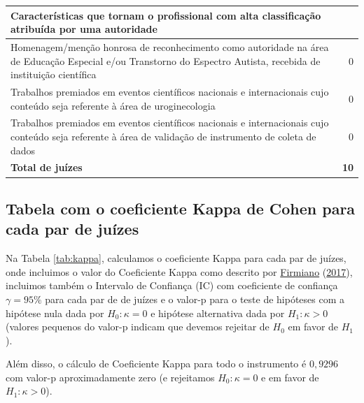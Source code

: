 \documentclass[
]{article}
\begin{document}
\begin{table}[htbp]
{\begin{tabular}{|l|r|}
\textbf{Características que tornam o profissional com alta classificação atribuída por uma autoridade } & \multicolumn{1}{l|}{\textbf{}} \\ \hline
Homenagem/menção honrosa de reconhecimento como autoridade na área
 de Educação Especial e/ou Transtorno do Espectro Autista, recebida de instituição científica & 0 \\ \hline
Trabalhos premiados em eventos científicos nacionais e internacionais cujo conteúdo
 seja referente à área de uroginecologia  & 0 \\ \hline
Trabalhos premiados em eventos científicos nacionais e internacionais cujo
 conteúdo seja referente à área de validação de instrumento de coleta de dados  & 0 \\ \hline
\textbf{Total de juízes } & \textbf{10} \\ \hline
\end{tabular}
}
\end{table}

\newpage

\hypertarget{tabela-com-o-coeficiente-kappa-de-cohen-para-cada-par-de-juuxedzes}{%
\subsection{Tabela com o coeficiente Kappa de Cohen para cada par de juízes}\label{tabela-com-o-coeficiente-kappa-de-cohen-para-cada-par-de-juuxedzes}}

Na Tabela \ref{tab:kappa}, calculamos o coeficiente Kappa para cada par de juízes, onde incluimos o valor do Coeficiente Kappa como descrito por \protect\hyperlink{ref-firmiano2017escala}{Firmiano} (\protect\hyperlink{ref-firmiano2017escala}{2017}), incluimos também o Intervalo de Confiança (IC) com coeficiente de confiança \(\gamma=95\%\) para cada par de de juízes e o valor-p para o teste de hipóteses com a hipótese nula dada por \(H_0: \kappa = 0\) e hipótese alternativa dada por \(H_1: \kappa > 0\) (valores pequenos do valor-p indicam que devemos rejeitar de \(H_0\) em favor de \(H_1\)).

Além disso, o cálculo de Coeficiente Kappa para todo o instrumento é \(0,9296\) com valor-p aproximadamente zero (e rejeitamos \(H_0: \kappa = 0\) e em favor de \(H_1: \kappa >0\)).
\end{document}
